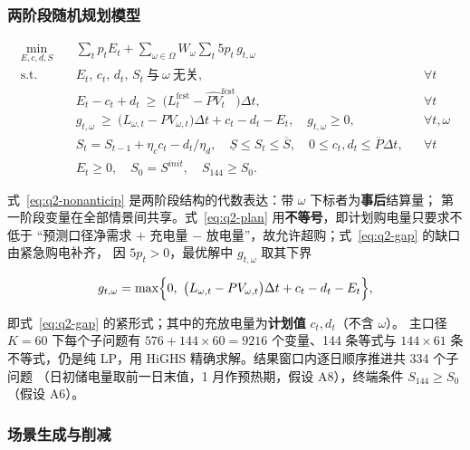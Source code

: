 \subsubsection{两阶段随机规划模型}\label{sec:q2-model}

\begin{subequations}\label{eq:q2}
\begin{align}
  \min_{E,c,d,S}\quad
  & \sum_{t}p_tE_t+\sum_{\omega\in\Omega}W_\omega\sum_{t}5p_t\,g_{t,\omega} \label{eq:q2-obj}\\
  \text{s.t.}\quad
  & E_t,\,c_t,\,d_t,\,S_t\ \text{与}\ \omega\ \text{无关}, && \forall t \label{eq:q2-nonanticip}\\
  & E_t-c_t+d_t\ \ge\ \bigl(L^{\text{fcst}}_t-\widehat{PV}^{\text{fcst}}_t\bigr)\Delta t, && \forall t \label{eq:q2-plan}\\
  & g_{t,\omega}\ \ge\ \bigl(L_{\omega,t}-PV_{\omega,t}\bigr)\Delta t+c_t-d_t-E_t,\quad g_{t,\omega}\ge0, && \forall t,\omega \label{eq:q2-gap}\\
  & S_t=S_{t-1}+\eta_cc_t-d_t/\eta_d,\quad \underline S\le S_t\le\overline S,\quad 0\le c_t,d_t\le\overline P\Delta t, && \forall t \label{eq:q2-soc}\\
  & E_t\ge0,\quad S_0=S^{init},\quad S_{144}\ge S_0 . && \label{eq:q2-nonneg}
\end{align}
\end{subequations}

式~\eqref{eq:q2-nonanticip} 是两阶段结构的代数表达：带 \(\omega\) 下标者为\textbf{事后}结算量；
第一阶段变量在全部情景间共享。式~\eqref{eq:q2-plan} 用\textbf{不等号}，即计划购电量只要求不低于
“预测口径净需求 \(+\) 充电量 \(-\) 放电量”，故允许超购；式~\eqref{eq:q2-gap} 的缺口由紧急购电补齐，
因 \(5p_t>0\)，最优解中 \(g_{t,\omega}\) 取其下界

\begin{equation}
  g_{t,\omega}=\max\Bigl\{0,\ \bigl(L_{\omega,t}-PV_{\omega,t}\bigr)\Delta t+c_t-d_t-E_t\Bigr\},
  \label{eq:q2-gapmax}
\end{equation}

即式~\eqref{eq:q2-gap} 的紧形式；其中的充放电量为\textbf{计划值} \(c_t,d_t\)（不含 \(\omega\)）。
主口径 \(K=60\) 下每个子问题有 \(576+144\times60=9216\) 个变量、144 条等式与
\(144\times61\) 条不等式，仍是纯 LP，用 HiGHS 精确求解。结果窗口内逐日顺序推进共 334 个子问题
（日初储电量取前一日末值，1 月作预热期，假设 A8），终端条件 \(S_{144}\ge S_0\)（假设 A6）。

\subsubsection{场景生成与削减}\label{sec:q2-scen}

